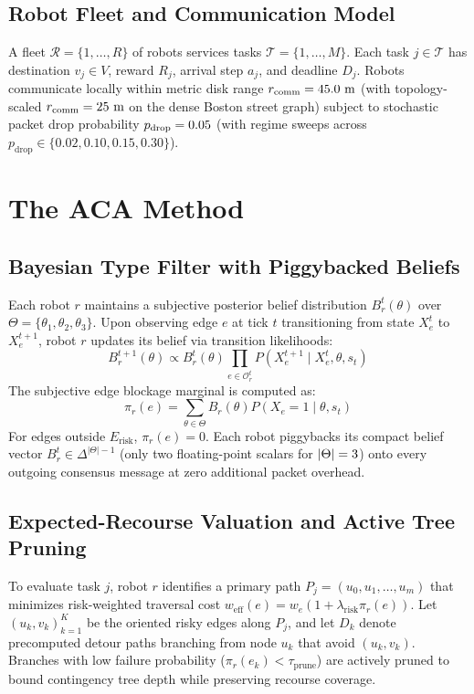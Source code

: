 \documentclass[lettersize,journal]{IEEEtran}
\begin{document}
\subsection{Robot Fleet and Communication Model}
A fleet $\mathcal{R} = \{1, \dots, R\}$ of robots services tasks $\mathcal{T} = \{1, \dots, M\}$. Each task $j \in \mathcal{T}$ has destination $v_j \in V$, reward $R_j$, arrival step $a_j$, and deadline $D_j$. Robots communicate locally within metric disk range $r_{\text{comm}} = 45.0\text{ m}$ (with topology-scaled $r_{\text{comm}} = 25\text{ m}$ on the dense Boston street graph) subject to stochastic packet drop probability $p_{\text{drop}} = 0.05$ (with regime sweeps across $p_{\text{drop}} \in \{0.02, 0.10, 0.15, 0.30\}$).

\section{The ACA Method}

\subsection{Bayesian Type Filter with Piggybacked Beliefs}
Each robot $r$ maintains a subjective posterior belief distribution $B_r^t(\theta)$ over $\Theta = \{\theta_1, \theta_2, \theta_3\}$. Upon observing edge $e$ at tick $t$ transitioning from state $X_e^t$ to $X_e^{t+1}$, robot $r$ updates its belief via transition likelihoods:
\begin{equation}
    B_r^{t+1}(\theta) \propto B_r^t(\theta) \prod_{e \in \mathcal{O}_r^t} P(X_e^{t+1} \mid X_e^t, \theta, s_t)
\end{equation}
The subjective edge blockage marginal is computed as:
\begin{equation}
    \pi_r(e) = \sum_{\theta \in \Theta} B_r(\theta) P(X_e = 1 \mid \theta, s_t)
\end{equation}
For edges outside $E_{\text{risk}}$, $\pi_r(e) = 0$. Each robot piggybacks its compact belief vector $B_r^t \in \Delta^{|\Theta|-1}$ (only two floating-point scalars for $|\Theta|=3$) onto every outgoing consensus message at zero additional packet overhead.

\subsection{Expected-Recourse Valuation and Active Tree Pruning}
To evaluate task $j$, robot $r$ identifies a primary path $P_j = (u_0, u_1, \dots, u_m)$ that minimizes risk-weighted traversal cost $w_{\text{eff}}(e) = w_e(1 + \lambda_{\text{risk}} \pi_r(e))$. Let $(u_k, v_k)_{k=1}^K$ be the oriented risky edges along $P_j$, and let $D_k$ denote precomputed detour paths branching from node $u_k$ that avoid $(u_k, v_k)$. Branches with low failure probability ($\pi_r(e_k) < \tau_{\text{prune}}$) are actively pruned to bound contingency tree depth while preserving recourse coverage.
\end{document}
